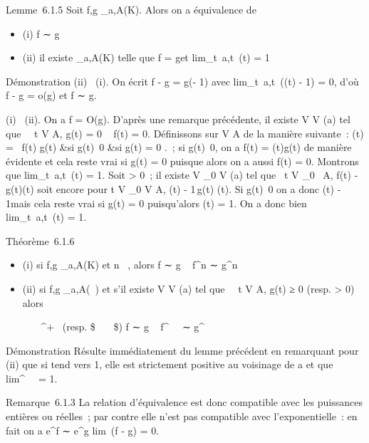 \documentclass[]{article}
\begin{document}
Lemme~6.1.5 Soit f,g _a,A(K). Alors on a équivalence de

\begin{itemize}
\itemsep1pt\parskip0pt
\item
  (i) f ∼ g
\item
  (ii) il existe \phi {}_a,A(K) telle que f = g\phi et
  lim_t\rightarrow~a,t\inA~\phi(t) = 1
\end{itemize}

Démonstration (ii) \rigtharrow~(i). On écrit f - g = g(\phi - 1) avec
lim_t\rightarrow~a,t\inA~(\phi(t) - 1) = 0, d'où f - g
= o(g) et f ∼ g.

(i) \rigtharrow~(ii). On a f = O(g). D'après une remarque précédente, il existe V \in
V (a) tel que \forall~~t \in V \bigcap A, g(t) = 0 \rigtharrow~ f(t) = 0.
Définissons \phi sur V \bigcap A de la manière suivante~: \phi(t) =
\left \ \cases  f(t)
\over g(t) &si g(t)\neq~0
 &si g(t) = 0  \right .~; si
g(t)\neq~0, on a f(t) = \phi(t)g(t) de manière
évidente et cela reste vrai si g(t) = 0 puisque alors on a aussi f(t) =
0. Montrons que lim_t\rightarrow~a,t\inA~\phi(t) = 1.
Soit \epsilon > 0~; il existe V _0 \in V (a) tel que
\forall~t \in V _0~ \bigcap A, f(t) -
g(t)\leq \epsilong(t) soit encore pour t \in V
_0 \bigcap V \bigcap A, \phi(t) -
1\,g(t)\leq
\epsilong(t). Si g(t)\neq~0 on a
donc \phi(t) - 1\leq \epsilon mais cela reste vrai si g(t) = 0
puisqu'alors \phi(t) = 1. On a donc bien
lim_t\rightarrow~a,t\inA~\phi(t) = 1.

Théorème~6.1.6

\begin{itemize}
\item
  (i) si f,g _a,A(K) et n \in {}~, alors f ∼ g \rigtharrow~ f^n ∼
  g^n
\item
  (ii) si f,g _a,A(~) et s'il existe V \in V (a) tel que
  \forall~~t \in V \bigcap A, g(t) ≥ 0 (resp. >
  0) alors

  \forall~\alpha~ \in {}~^+~\text
  (resp. \$\forall~\alpha~ \in {}~\$) f ∼ g \rigtharrow~ f^\alpha~~
  ∼ g^\alpha~
\end{itemize}

Démonstration Résulte immédiatement du lemme précédent en remarquant
pour (ii) que si \phi tend vers 1, elle est strictement positive au
voisinage de a et que lim\phi^\alpha~~ = 1.

Remarque~6.1.3 La relation d'équivalence est donc compatible avec les
puissances entières ou réelles~; par contre elle n'est pas compatible
avec l'exponentielle~: en fait on a e^f ∼ e^g
\Leftrightarrow lim~(f - g) = 0.
\end{document}
